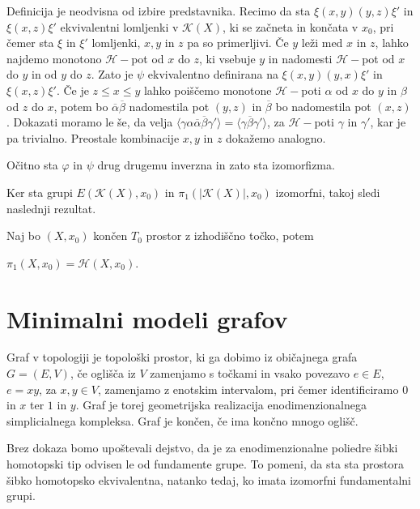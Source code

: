 \documentclass[mat1]{fmfdelo}
\DeclareRobustCommand{\h}{
    \mathcal{H}}
\DeclareRobustCommand{\pot}{
    $\h-$pot
}
\begin{document}
\begin{dokaz}
Definicija je neodvisna od izbire predstavnika. Recimo da sta $\xi(x,y)(y,z)\xi'$ in $\xi(x,z)\xi'$ ekvivalentni lomljenki v $\mathcal{K}(X)$, ki se začneta in končata v $x_0$, pri čemer sta $\xi$ in $\xi'$ lomljenki, $x,y$ in $z$ pa so primerljivi.
Če $y$ leži med $x$ in $z$, lahko najdemo monotono $\mathcal{H}-$pot od $x$ do $z$, ki vsebuje $y$ in nadomesti \pot od $x$ do $y$ in od $y$ do $z$. Zato je $\psi$ ekvivalentno definirana na $\xi(x,y)(y,x)\xi'$ in $\xi(x,z)\xi'$.
Če je $z\leq x \leq y$ lahko poiščemo monotone $\mathcal{H}-$poti $\alpha$ od $x$ do $y$ in $\beta$ od $z$ do $x$, potem bo $\overline{\alpha}\overline{\beta}$ nadomestila pot $(y,z)$ in $\overline{\beta}$ bo nadomestila pot $(x,z)$. Dokazati moramo le še, da velja $\langle\gamma \alpha \overline{\alpha}\overline{\beta}\gamma'\rangle=\langle \gamma\overline{\beta}\gamma'\rangle$, za $\h-$poti $\gamma$ in $\gamma'$, kar je pa trivialno. Preostale kombinacije $x,y$ in $z$ dokažemo analogno.

Očitno sta $\varphi$ in $\psi$ drug drugemu inverzna in zato sta izomorfizma.
\end{dokaz}

Ker sta grupi $E(\mathcal{K}(X),x_0)$ in $\pi_1(|\mathcal{K}(X)|,x_0)$ izomorfni, takoj sledi naslednji rezultat.

\begin{posledica}
    Naj bo $(X,x_0)$ končen $T_0$ prostor z izhodiščno točko, potem 
    
    $\pi_1(X,x_0)=\mathscr{H}(X,x_0)$.
\end{posledica}

\section{Minimalni modeli grafov}

Graf v topologiji je topološki prostor, ki ga dobimo iz običajnega grafa 
$G=(E,V)$, če oglišča iz $V$ zamenjamo s točkami in vsako povezavo $e\in 
E$, $e=xy$, za $x,y\in V$, zamenjamo z enotskim intervalom, pri čemer 
identificiramo $0$ in $x$ ter $1$ in $y$.
Graf je torej geometrijska realizacija enodimenzionalnega simplicialnega 
kompleksa. Graf je končen, če ima končno mnogo oglišč. 

Brez dokaza bomo upoštevali dejstvo, da je za enodimenzionalne poliedre 
šibki homotopski tip odvisen le od fundamente grupe. To pomeni, da sta 
sta prostora šibko homotopsko ekvivalentna, natanko tedaj, ko imata 
izomorfni fundamentalni grupi.
\end{document}
